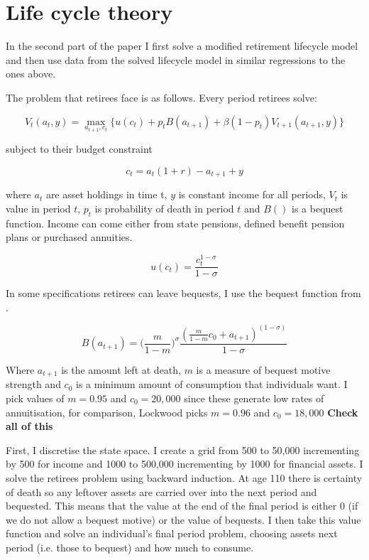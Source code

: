 \documentclass[12pt]{article}
\begin{document}
\section{Life cycle theory}

In the second part of the paper I first solve a modified retirement lifecycle model and then use data from the solved lifecycle
model in similar regressions to the ones above.

The problem that retirees face is as follows. Every period retirees solve:

\begin{equation*}
    V_{t}(a_{t}, y) = \underset{a_{t+1}, c_{t}}{\max} \{ u(c_{t}) + p_{t}B(a_{t+1}) + \beta(1-p_{t})V_{t+1}(a_{t+1}, y) \}
\end{equation*}

subject to their budget constraint

\begin{equation*}
    c_{t} =a_{
    t}(1 +r) -  a_{t+1} + y
\end{equation*}

where $a_{t}$ are asset holdings in time t, $y$ is constant income for all periods, $V_{t}$ is value in period $t$, $p_{t}$ is probability of
death in period $t$ and $B()$ is a bequest function. Income can come either
from state pensions, defined benefit pension plans or purchased annuities.

\begin{equation*}
    u(c_{t}) = \frac{c_{t}^{1 - \sigma}}{1 - \sigma}
\end{equation*}

In some specifications retirees can leave bequests, I use the bequest function from
\cite{lockwood_red_2012}.

\begin{equation*}
    B(a_{t+1}) = \bigl( \frac{m}{1 - m} \bigr)^{\sigma}  \frac{(\frac{m}{1 - m}c_{0} + a_{t+1})^{(1 - \sigma)}}{1 - \sigma}
\end{equation*}

Where $a_{t+1}$ is the amount left at death, $m$ is a measure of bequest motive strength and $c_{0}$ is
a minimum amount of consumption that individuals want. I pick values of $m = 0.95$ and $c_{0} = 20,000$ since
these generate low rates of annuitisation, for comparison, Lockwood picks $m = 0.96$ and $c_{0} = 18,000$
\textbf{Check all of this}

First, I discretise the state space. I create a grid from 500 to 50,000 incrementing by 500 for income and 1000 to
500,000 incrementing by 1000 for financial assets. I solve the retirees problem using backward induction. At age 110 there is certainty of death so any leftover assets
are carried over into the next period and bequested. This means that the value at the end of the final period is
either 0 (if we do not allow a bequest motive) or the value of bequests. I then take this value function and solve
an individual's final period problem, choosing assets next period (i.e. those to bequest) and how much to consume.
\end{document}
